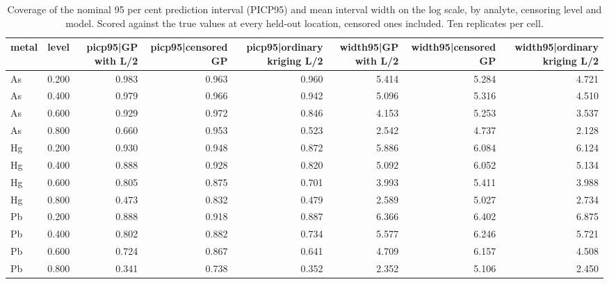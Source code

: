 \begin{table}[htbp]
\centering
\caption{Coverage of the nominal 95 per cent prediction interval (PICP95) and mean interval width on the log scale, by analyte, censoring level and model. Scored against the true values at every held-out location, censored ones included. Ten replicates per cell.}
\label{tab:coverage}
\footnotesize
\begin{tabular}{llrrrrrr}
\toprule
metal & level & picp95|GP with L/2 & picp95|censored GP & picp95|ordinary kriging L/2 & width95|GP with L/2 & width95|censored GP & width95|ordinary kriging L/2 \\
\midrule
As & 0.200 & 0.983 & 0.963 & 0.960 & 5.414 & 5.284 & 4.721 \\
As & 0.400 & 0.979 & 0.966 & 0.942 & 5.096 & 5.316 & 4.510 \\
As & 0.600 & 0.929 & 0.972 & 0.846 & 4.153 & 5.253 & 3.537 \\
As & 0.800 & 0.660 & 0.953 & 0.523 & 2.542 & 4.737 & 2.128 \\
Hg & 0.200 & 0.930 & 0.948 & 0.872 & 5.886 & 6.084 & 6.124 \\
Hg & 0.400 & 0.888 & 0.928 & 0.820 & 5.092 & 6.052 & 5.134 \\
Hg & 0.600 & 0.805 & 0.875 & 0.701 & 3.993 & 5.411 & 3.988 \\
Hg & 0.800 & 0.473 & 0.832 & 0.479 & 2.589 & 5.027 & 2.734 \\
Pb & 0.200 & 0.888 & 0.918 & 0.887 & 6.366 & 6.402 & 6.875 \\
Pb & 0.400 & 0.802 & 0.882 & 0.734 & 5.577 & 6.246 & 5.721 \\
Pb & 0.600 & 0.724 & 0.867 & 0.641 & 4.709 & 6.157 & 4.508 \\
Pb & 0.800 & 0.341 & 0.738 & 0.352 & 2.352 & 5.106 & 2.450 \\
\bottomrule
\end{tabular}
\end{table}
